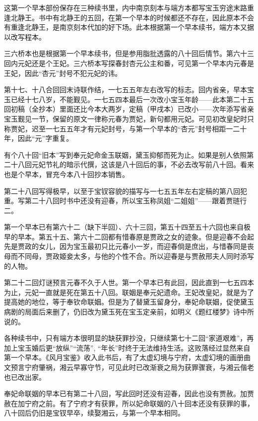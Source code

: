 \par 这第一个早本部份保存在三种续书里，内中南京刻本与端方本都写宝玉穷途末路重逢北静王。书中有北静王的五回，在第一个早本的时候都还不存在，因此原本不会有重逢北静王，是南京刻本代加的好下场。此本根据第一个早本续书，端方本又据以改写程本。
\par 三六桥本也是根据第一个早本续书，但是参用脂批透露的八十回后情节。第六十三回内元妃还是个王妃。三六桥本写探春封杏元公主和番，可见第一个早本内元春是王妃，因此“杏元”封号不犯元妃的讳。
\par 第十七、十八合回回末诗联作结，一七五五年左右改写的标志。回内省亲，早本宝玉已经十七八岁，不能觐见。一七五四本最后一次改小宝玉年龄——此本第二十五回初稿（全抄本）里面还比今本大两岁，定稿（甲戌本）已改小——次年添写省亲宝玉觐见一节，保留的原文一律称元春为贾妃，新句都用元妃。可见初改皇妃时只称贾妃，迟至一七五五年才有元妃封号，与第一个早本的“杏元”封号相距一二十年，因此“元”字重复。
\par 有个八十回“旧本”写到奉元妃命金玉联姻，黛玉抑郁而死为止。如果是别人依照第二十八回元妃节礼的暗示代撰，这该是八十回后的事，不必去改写前八十回。看来也是个早本，冒充今本八十回抄本销售。
\par 第二十八回写得极早，以至于宝钗容貌的描写与一七五五年左右定稿的第八回犯重。写第二十八回时书中还没有迎春，所以宝玉称凤姐“二姐姐”——跟着贾琏行二。
\par 第一个早本已有第六十二（缺下半回）、六十三回，第五十四至五十六回也来自极早的早本。第五十五、第六十二回都有惜春原是贾政之女的迹象。但是迎春不会起先是贾政的女儿，因为宝玉最初只比元春小一岁，而迎春倘是庶出，与惜春同是丧母而不同母，贾政姬妾太多，与他的个性不合。所以迎春是与贾赦邢夫人同时添写的人物。
\par 第二十二回灯谜预言元春不久于人世。第一个早本已有此回，因此直到一七五四本为止，元妃一直就是死在第五十八回。联姻是奉元妃遗命。王妃改皇妃，就是为了提高她的地位，等于奉钦命联姻。但是为了替黛玉留身分，奉妃命联姻，促使黛玉病剧的局面后来删了，仍旧改为黛玉死在宝玉定亲前，如明义《题红楼梦》诗中所说的。
\par 各种续书中，只有端方本很明显的缺获罪抄没，只继续第七十二回“家道艰难”，再加上宝玉婚后更“放纵”“流荡”, “年长”时终于无法维持生活。这败落经过显然来自第一个早本。《风月宝鉴》收入此书后，有了太虚幻境与宁府，太虚幻境的画册曲文预言宁府肇祸，湘云早寡守节，可见此时已改渐衰之局为获罪骤衰，与湘云偕老也已改出家。
\par 奉妃命联姻的早本已有第二十八回，写此回时还没有迎春，因此也没有贾赦。加贾赦在加宁府之前。有了宁府才有获罪，所以妃命联姻的八十回本还没有获罪的事，八十回后仍旧是宝钗早卒，续娶湘云，与第一个早本相同。

